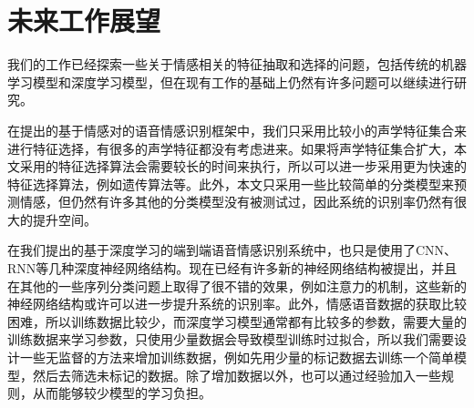 \section{未来工作展望}
\label{sec:prospect}

我们的工作已经探索一些关于情感相关的特征抽取和选择的问题，包括传统的机器学习模型和深度学习模型，但在现有工作的基础上仍然有许多问题可以继续进行研究。

在提出的基于情感对的语音情感识别框架中，我们只采用比较小的声学特征集合来进行特征选择，有很多的声学特征都没有考虑进来。如果将声学特征集合扩大，本文采用的特征选择算法会需要较长的时间来执行，所以可以进一步采用更为快速的特征选择算法，例如遗传算法等。此外，本文只采用一些比较简单的分类模型来预测情感，但仍然有许多其他的分类模型没有被测试过，因此系统的识别率仍然有很大的提升空间。

在我们提出的基于深度学习的端到端语音情感识别系统中，也只是使用了CNN、RNN等几种深度神经网络结构。现在已经有许多新的神经网络结构被提出，并且在其他的一些序列分类问题上取得了很不错的效果，例如注意力的机制，这些新的神经网络结构或许可以进一步提升系统的识别率。此外，情感语音数据的获取比较困难，所以训练数据比较少，而深度学习模型通常都有比较多的参数，需要大量的训练数据来学习参数，只使用少量数据会导致模型训练时过拟合，所以我们需要设计一些无监督的方法来增加训练数据，例如先用少量的标记数据去训练一个简单模型，然后去筛选未标记的数据。除了增加数据以外，也可以通过经验加入一些规则，从而能够较少模型的学习负担。